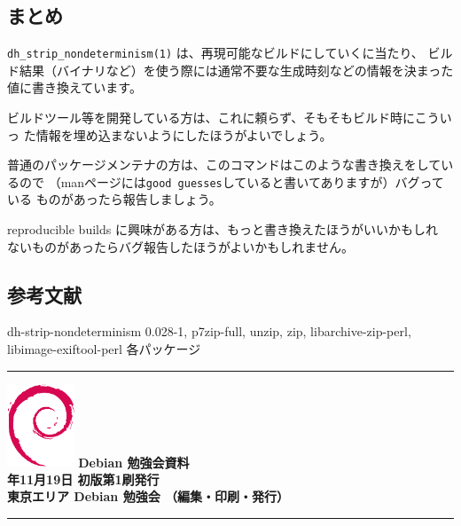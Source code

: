 \documentclass[mingoth,a4paper]{jsarticle}
\newcommand{\debmtgyear}{2016}
\newcommand{\debmtgmonth}{11}
\newcommand{\debmtgdate}{19}
\begin{document}
\subsection{まとめ}

\verb|dh_strip_nondeterminism(1)| は、再現可能なビルドにしていくに当たり、
ビルド結果（バイナリなど）を使う際には通常不要な生成時刻などの情報を決まった
値に書き換えています。

ビルドツール等を開発している方は、これに頼らず、そもそもビルド時にこういっ
た情報を埋め込まないようにしたほうがよいでしょう。

普通のパッケージメンテナの方は、このコマンドはこのような書き換えをしているので
（manページには\verb|good guesses|していると書いてありますが）バグっている
ものがあったら報告しましょう。

reproducible builds に興味がある方は、もっと書き換えたほうがいいかもしれ
ないものがあったらバグ報告したほうがよいかもしれません。

\subsection{参考文献}

dh-strip-nondeterminism 0.028-1, p7zip-full, unzip, zip, libarchive-zip-perl,
libimage-exiftool-perl 各パッケージ

%
\mbox{}\newpage


\vspace*{15cm}
\hrule
\vspace{2mm}
\includegraphics[width=2cm]{image200502/openlogo-nd.eps}
\noindent \Large \bf Debian 勉強会資料\\
\noindent \normalfont \debmtgyear{}年\debmtgmonth{}月\debmtgdate{}日 \hspace{5mm}  初版第1刷発行\\
\noindent \normalfont 東京エリア Debian 勉強会 （編集・印刷・発行）\\
\hrule
\end{document}
